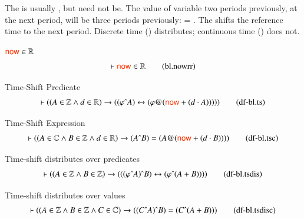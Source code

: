  The  is usually , but need not be.  The value of variable  two periods previously, at the next period, will be three periods previously:
  = .  The  shifts the reference time to the next period.  Discrete time (\lstk{^}) distributes; continuous time () does not.

 
 \begin{definition} {$\mathsf{\msc{now}} \in \mathbb{R}$}
\begin{align}
\vdash \mathsf{\msc{now}} \in \mathbb{R}\label{eq:bl.nowrr}\tag{bl.nowrr}
\end{align}
\end{definition}

\begin{definition} {Time-Shift Predicate}
\begin{align}
\vdash ( ( A \in \mathbb{Z} \wedge d \in \mathbb{R} ) \rightarrow ( ( \varphi
  \string^   A ) \leftrightarrow ( \varphi @ ( \mathsf{\msc{now}} + ( d \cdot A
    ) ) ) ) )\label{eq:df-bl.ts}\tag{df-bl.ts}
\end{align}
\end{definition}

\begin{definition} {Time-Shift Expression}
\begin{align}
\vdash ( ( A \in \mathbb{C} \wedge B \in \mathbb{Z} \wedge d \in \mathbb{R} )
    \rightarrow ( A \string^ B ) = ( A @ ( \mathsf{\msc{now}} + ( d \cdot B ) )
    ) )\label{eq:df-bl.tsc}\tag{df-bl.tsc}
\end{align}
\end{definition}

\begin{definition} {Time-shift distributes over predicates}
\begin{align}
\vdash ( ( A \in \mathbb{Z} \wedge B \in \mathbb{Z} ) \rightarrow ( ( ( \varphi
    \string^ A ) \string^ B ) \leftrightarrow ( \varphi \string^ ( A + B ) ) )
    )\label{eq:df-bl.tsdis}\tag{df-bl.tsdis}
\end{align}
\end{definition}

\begin{definition} {Time-shift distributes over values}
\begin{align}
\vdash ( ( A \in \mathbb{Z} \wedge B \in \mathbb{Z} \wedge C \in \mathbb{C} )
    \rightarrow ( ( C \string^ A ) \string^ B ) = ( C \string^ ( A + B ) )
    )\label{eq:df-bl.tsdisc}\tag{df-bl.tsdisc}
\end{align}
\end{definition}

